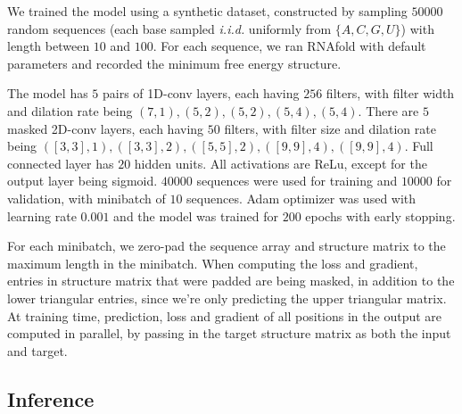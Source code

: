 \documentclass{article}
\begin{document}
We trained the model using a synthetic dataset, constructed by sampling $50000$ random sequences
(each base sampled \textit{i.i.d.} uniformly from $\{A, C, G, U\}$)
with length
between $10$ and $100$.
For each sequence, we ran RNAfold\cite{lorenz2011viennarna} with default parameters and
recorded the minimum free energy structure.

The model has $5$ pairs of 1D-conv layers, each having $256$ filters, with filter width and dilation rate being
$(7,1), (5,2), (5,2), (5,4), (5,4)$.
There are $5$ masked 2D-conv layers, each having $50$ filters, with filter size and dilation rate being
$([3,3],1), ([3,3],2), ([5,5],2), ([9,9],4), ([9,9],4)$.
Full connected layer has $20$ hidden units. All activations are ReLu, except for the output layer being sigmoid.
$40000$ sequences were used for training and $10000$ for validation, with minibatch of $10$ sequences.
Adam optimizer was used with learning rate $0.001$ and the model was trained for $200$ epochs with early stopping.


For each minibatch, we zero-pad the sequence array and structure matrix to the maximum length in the minibatch.
When computing the loss and gradient, entries in structure matrix that were padded are being masked,
in addition to the lower triangular entries, since we're only predicting the upper triangular matrix.
At training time, prediction, loss and gradient of all positions in the output are computed in parallel,
by passing in the target structure matrix as both the input and target.







\subsection{Inference}

\end{document}
